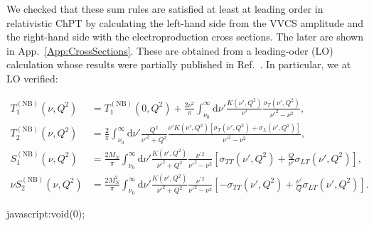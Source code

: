 \documentclass[twocolumn,prc,showpacs,nofootinbib,preprintnumbers,amsmath,amssymb,superscriptaddress]{revtex4-1}
\def\dd{\mathrm{d}}
\begin{document}
We checked that these sum rules are satisfied at least at leading order in relativistic ChPT by calculating the left-hand side from the VVCS amplitude and the right-hand side with the electroproduction cross sections. 
The later are shown in App.~\ref{App:CrossSections}. 
These are obtained from a leading-oder (LO) calculation whose results were partially published in Ref.~\cite{Alarcon:2013cba}. In particular, we at LO verified:
\begin{widetext}
\begin{subequations}
\begin{align}
T^{(\mathrm{NB})}_1(\nu,Q^2)&= T^{(\mathrm{NB})}_1(0,Q^2) + \frac{2 \nu^2}{ \pi}\int_{\nu_0}^{\infty}\!\! \dd\nu' \frac{K(\nu',Q^2)}{\nu'}\frac{\sigma_T(\nu',Q^2)}{\nu'^2-\nu^2} \label{Eq:T1disp}, \\
T^{(\mathrm{NB})}_2(\nu,Q^2)&= \frac{2}{\pi}\int_{\nu_0}^{\infty}\!\! \dd\nu'  \frac{ Q^2}{\nu'^2+Q^2} \frac{\nu' K(\nu',Q^2)[\sigma_T(\nu',Q^2)+\sigma_L(\nu',Q^2)]}{\nu'^2-\nu^2}\label{Eq:T2disp}, \\
S^{(\mathrm{NB})}_1(\nu,Q^2)&= \frac{2M_N}{\pi}\int_{\nu_0}^{\infty}\!\! \dd\nu'  \frac{ K(\nu',Q^2)}{\nu'^2+Q^2} \frac{ \nu^{\prime\, 2}}{\nu'^2-\nu^2} [\sigma_{TT}(\nu',Q^2)+\frac{Q}{\nu'}\sigma_{LT}(\nu',Q^2)]\label{Eq:S1disp},\\
\nu S^{(\mathrm{NB})}_2(\nu,Q^2)&= \frac{2 M_N^2}{\pi}\int_{\nu_0}^{\infty}\!\! \dd\nu'  \frac{ K(\nu',Q^2)}{\nu'^2+Q^2} \frac{ \nu^{\prime\, 2}}{\nu'^2-\nu^2} [-\sigma_{TT}(\nu',Q^2)+\frac{\nu'}{Q}\sigma_{LT}(\nu',Q^2)]\label{Eq:T2disp}.
\end{align}
\end{subequations}

\end{widetext}
javascript:void(0);
\end{document}

